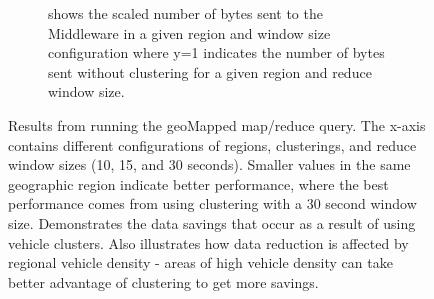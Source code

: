 \documentclass{thesis}
\begin{document}
\begin{figure}
\begin{subfigure}[h]{0.45\textwidth}
            \caption{shows the scaled number of bytes sent to the Middleware in a given region and window size
            configuration where y=1 indicates the number of bytes sent without clustering for a given region
            and reduce window size.}
        \end{subfigure}
        \caption{Results from running the geoMapped map/reduce query. The x-axis contains different
            configurations of regions, clusterings, and reduce window sizes (10, 15, and 30 seconds). Smaller
            values in the same geographic region indicate better performance, where the best performance
            comes from using clustering with a 30 second window size. Demonstrates the data savings that occur as a result of using
            vehicle clusters. Also illustrates how data reduction is affected by regional vehicle
            density - areas of high vehicle density can take better advantage of clustering to get more savings.}
        \label{results:geomapped}
    \end{figure}
\end{document}
